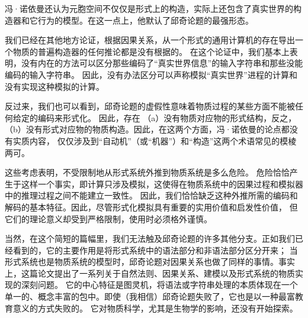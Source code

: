\documentclass[a4paper,12pt]{article}
\begin{document}
冯·诺依曼还认为元胞空间不仅仅是形式上的构造，实际上还包含了真实世界的构造器和它行为的模型。在这一点上，他默认了邱奇论题的最强形态。

我们已经在其他地方\cite{RosenR1985}论证，根据因果关系，从一个形式的通用计算机的存在导出一个物质的普遍构造器的任何推论都是没有根据的。
在这个论证中，我们基本上表明，没有内在的方法可以区分那些编码了“真实世界信息”的输入字符串和那些没能编码的输入字符串。
因此，没有办法区分可以声称模拟“真实世界”进程的计算和没有实现这种模拟的计算。

反过来，我们也可以看到，邱奇论题的虚假性意味着物质过程的某些方面不能被任何给定的编码来形式化。
因此，存在 （a）没有物质对应物的形式结构，反之，（b）没有形式对应物的物质构造。因此，在这两个方面，冯·诺依曼的论点都没有实质内容，
仅仅涉及到“自动机”（或“机器”）和“构造”这两个术语常见的模棱两可。

这些考虑表明，不受限制地从形式系统外推到物质系统是多么危险。
危险恰恰产生于这样一个事实，即计算只涉及模拟，这使得在物质系统中的因果过程和模拟器中的推理过程之间不能建立一致性。
因此，我们恰恰缺乏这种外推所需的编码和解码的基本特征。因此，尽管形式化模拟具有重要的实用价值和启发性价值，
但它们的理论意义却受到严格限制，使用时必须格外谨慎。

当然，在这个简短的篇幅里，我们无法触及邱奇论题的许多其他分支。正如我们已经看到的，它的主要作用是将形式系统中的语法部分和非语法部分区分开来；
当形式系统也是物质系统的模型时，邱奇论题对因果关系也做了同样的事情。事实上，这篇论文提出了一系列关于自然法则、因果关系、建模以及形式系统的物质实现的深刻问题。
它的中心特征是图灵机，将语法或字符串处理的本质体现在一个单一的、概念丰富的包中。即使（我相信）邱奇论题失败了，它也是以一种最富教育意义的方式失败的。
它对物质科学，尤其是生物学的影响，还没有开始探索。

\newpage
{}
{}



\newpage
{}
{}
\printindex
\printglossaries
\end{document}
